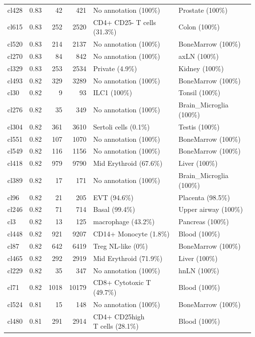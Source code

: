 \begin{table}[ht!]
\begin{tabular}{lrrrll}
  cl428 & 0.83 &  42 & 421 & No annotation (100\%) & Prostate (100\%) \\ 
  cl615 & 0.83 & 252 & 2520 & CD4+ CD25- T cells (31.3\%) & Colon (100\%) \\ 
  cl520 & 0.83 & 214 & 2137 & No annotation (100\%) & BoneMarrow (100\%) \\ 
  cl270 & 0.83 &  84 & 842 & No annotation (100\%) & axLN (100\%) \\ 
  cl329 & 0.83 & 253 & 2534 & Private (4.9\%) & Kidney (100\%) \\ 
  cl493 & 0.82 & 329 & 3289 & No annotation (100\%) & BoneMarrow (100\%) \\ 
  cl30 & 0.82 &   9 &  93 & ILC1 (100\%) & Tonsil (100\%) \\ 
  cl276 & 0.82 &  35 & 349 & No annotation (100\%) & Brain\_Microglia (100\%) \\ 
  cl304 & 0.82 & 361 & 3610 & Sertoli cells (0.1\%) & Testis (100\%) \\ 
  cl551 & 0.82 & 107 & 1070 & No annotation (100\%) & BoneMarrow (100\%) \\ 
  cl549 & 0.82 & 116 & 1156 & No annotation (100\%) & BoneMarrow (100\%) \\ 
  cl418 & 0.82 & 979 & 9790 & Mid Erythroid (67.6\%) & Liver (100\%) \\ 
  cl389 & 0.82 &  17 & 171 & No annotation (100\%) & Brain\_Microglia (100\%) \\ 
  cl96 & 0.82 &  21 & 205 & EVT (94.6\%) & Placenta (98.5\%) \\ 
  cl246 & 0.82 &  71 & 714 & Basal (99.4\%) & Upper airway (100\%) \\ 
  cl3 & 0.82 &  13 & 125 & macrophage (43.2\%) & Pancreas (100\%) \\ 
  cl448 & 0.82 & 921 & 9207 & CD14+ Monocyte (1.8\%) & Blood (100\%) \\ 
  cl87 & 0.82 & 642 & 6419 & Treg NL-like (0\%) & BoneMarrow (100\%) \\ 
  cl465 & 0.82 & 292 & 2919 & Mid Erythroid (71.9\%) & Liver (100\%) \\ 
  cl229 & 0.82 &  35 & 347 & No annotation (100\%) & hnLN (100\%) \\ 
  cl71 & 0.82 & 1018 & 10179 & CD8+ Cytotoxic T (49.7\%) & Blood (100\%) \\ 
  cl524 & 0.81 &  15 & 148 & No annotation (100\%) & BoneMarrow (100\%) \\ 
  cl480 & 0.81 & 291 & 2914 & \specialcell[t]{CD4+ CD25high\\T cells (28.1\%)} & Blood (100\%) \\ 

\end{tabular}
\end{table}
